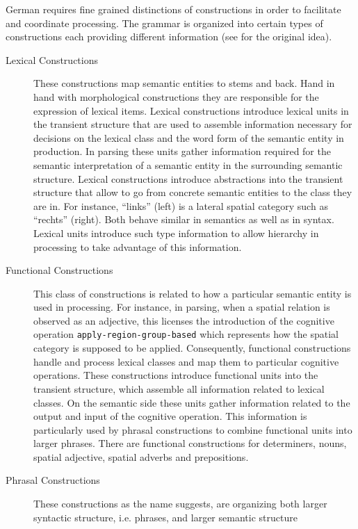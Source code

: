 German requires fine grained distinctions of constructions
in order to facilitate and coordinate processing. The grammar is 
organized into certain types of constructions each providing different information
(see \citealp{steels2011phrasal} for the original idea). 
\begin{description}
\item[Lexical Constructions] These constructions map semantic entities
to stems and back. Hand in hand with morphological constructions they
are responsible for the expression of lexical items. Lexical constructions
introduce lexical units in the transient structure that are used to assemble
information necessary for decisions on the lexical class and the word form 
of the semantic entity in production. In parsing these units gather information 
required for the semantic interpretation of a semantic entity in the 
surrounding semantic structure. Lexical constructions introduce abstractions
into the transient structure that allow to go from concrete semantic entities
to the class they are in. For instance, ``links'' (left) is a lateral spatial 
category such as ``rechts'' (right). Both behave similar in semantics 
as well as in syntax. Lexical units introduce such type information
to allow hierarchy in processing to take advantage of this information.
\item[Functional Constructions] This class of constructions is related to
how a particular semantic entity is used in processing. For instance, in parsing,
when a spatial relation is observed as an adjective, this licenses the introduction 
of the cognitive operation {\footnotesize\tt apply-region-group-based} which represents how 
the spatial category is supposed to be applied. Consequently, functional constructions 
handle and process lexical classes and map them to particular cognitive operations.
These constructions introduce functional units into the transient structure, which
assemble all information related to lexical classes. On the semantic side
these units gather information related to the output and input of 
the cognitive operation. This information is particularly used by phrasal constructions
to combine functional units into larger phrases.
There are functional constructions for determiners, nouns, spatial adjective, spatial
adverbs and prepositions.
\item[Phrasal Constructions] These constructions as the name suggests, are organizing both
larger syntactic structure, i.e. phrases, and larger semantic structure

\end{description}
